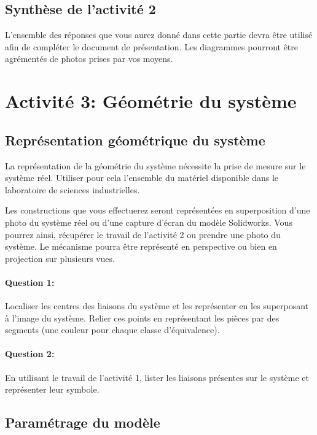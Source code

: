 \subsection{Synthèse de l'activité 2}

L'ensemble des réponses que vous aurez donné dans cette partie devra être utilisé afin de compléter le document de présentation. Les diagrammes pourront être agrémentés de photos prises par vos moyens.

\section{Activité 3: Géométrie du système}

\subsection{Représentation géométrique du système}

La représentation de la géométrie du système nécessite la prise de mesure sur le système réel. Utiliser pour cela l'ensemble du matériel disponible dans le laboratoire de sciences industrielles.

Les constructions que vous effectuerez seront représentées en superposition d'une photo du système réel ou d'une capture d'écran du modèle Solidworks. Vous pourrez ainsi, récupérer le travail de l'activité 2 ou prendre une photo du système. Le mécanisme pourra être représenté en perspective ou bien en projection sur plusieurs vues.

\paragraph{Question 1:} Localiser les centres des liaisons du système et les représenter en les superposant à l'image du système. Relier ces points en représentant les pièces par des segments (une couleur pour chaque classe d'équivalence).

\paragraph{Question 2:} En utilisant le travail de l'activité 1, lister les liaisons présentes sur le système et représenter leur symbole.

\reponse[4]

\subsection{Paramétrage du modèle}

